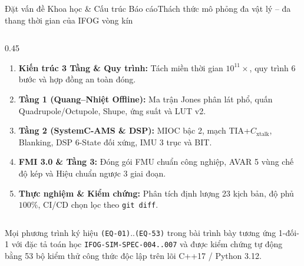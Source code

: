 \documentclass[aspectratio=169,8pt]{beamer}
\begin{document}
\begin{frame}{Đặt vấn đề Khoa học \& Cấu trúc Báo cáo}{Thách thức mô phỏng đa vật lý – đa thang thời gian của IFOG vòng kín}
\begin{columns}[T]
\begin{column}{0.45\textwidth}
\begin{remarkbox}
\begin{enumerate}
        \item \textbf{Kiến trúc 3 Tầng \& Quy trình:} Tách miền thời gian $10^{11}\times$, quy trình 6 bước và hợp đồng an toàn đóng.
        \item \textbf{Tầng 1 (Quang–Nhiệt Offline):} Ma trận Jones phân lát phổ, quấn Quadrupole/Octupole, Shupe, ứng suất và LUT v2.
        \item \textbf{Tầng 2 (SystemC-AMS \& DSP):} MIOC bậc 2, mạch TIA+$C_{\text{xtalk}}$, Blanking, DSP 6-State đối xứng, IMU 3 trục và BIT.
        \item \textbf{FMI 3.0 \& Tầng 3:} Đóng gói FMU chuẩn công nghiệp, AVAR 5 vùng chế độ kép và Hiệu chuẩn ngược 3 giai đoạn.
        \item \textbf{Thực nghiệm \& Kiểm chứng:} Phân tích định lượng 23 kịch bản, độ phủ $100\%$, CI/CD chọn lọc theo \texttt{git diff}.
      \end{enumerate}
    \end{remarkbox}
  \end{column}
\end{columns}

\vspace{0.14cm}
\begin{notebox}
  Mọi phương trình ký hiệu \texttt{(EQ-01)}..\texttt{(EQ-53)} trong bài trình bày tương ứng 1-đối-1 với đặc tả toán học \texttt{IFOG-SIM-SPEC-004..007} và được kiểm chứng tự động bằng 53 bộ kiểm thử công thức độc lập trên lõi C++17 / Python 3.12.
\end{notebox}
\end{frame}
\end{document}
